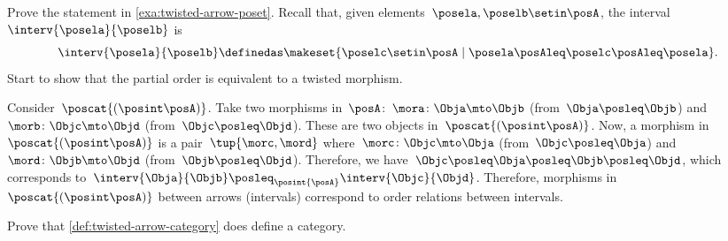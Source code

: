 \begin{exercise}
    Prove the statement in \cref{exa:twisted-arrow-poset}.
    Recall that, given elements~$\posela, \poselb \setin \posA$, the interval~$\interv{\posela}{\poselb}$ is
    \begin{equation}
        \interv{\posela}{\poselb}
        \definedas \makeset{\poselc \setin \posA \mid \posela\posAleq \poselc \posAleq \posela}.
    \end{equation}
    Start to show that the partial order is equivalent to a twisted morphism.
\end{exercise}
\begin{solution}
    Consider~$\poscat{\left(\posint\posA\right)}$.
    Take two morphisms in~$\posA$:~$\mora\colon \Obja \mto \Objb$ (from~$\Obja \posleq \Objb$) and~$\morb\colon \Objc\mto \Objd$ (from~$\Objc \posleq \Objd$).
    These are two objects in~$\poscat{\left(\posint\posA\right)}$.
    Now, a morphism in~$\poscat{\left(\posint\posA\right)}$ is a pair~$\tup{\morc,\mord}$ where~$\morc\colon \Objc \mto \Obja$ (from~$\Objc\posleq \Obja$) and~$\mord\colon \Objb \mto \Objd$ (from~$\Objb\posleq \Objd$).
    Therefore, we have~$\Objc\posleq \Obja\posleq \Objb\posleq \Objd$, which corresponds to~$\interv{\Obja}{\Objb}\posleq_{\posint{\posA}}\interv{\Objc}{\Objd}$.
    Therefore, morphisms in~$\poscat{\left(\posint\posA\right)}$ between arrows (intervals) correspond to order relations between intervals.
\end{solution}


\vfill

\begin{gradedexercise}
    \label{ex:TwistedCat}
    Prove that \cref{def:twisted-arrow-category} does define a category.
\end{gradedexercise}

